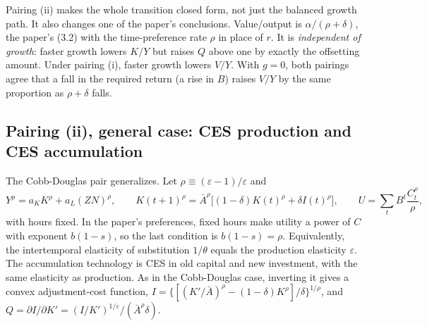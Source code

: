 \documentclass[11pt]{article}
\newcommand{\e}{\varepsilon}
\begin{document}
Pairing (ii) makes the whole transition closed form, not just the balanced growth path.
It also changes one of the paper's conclusions. Value/output is $\alpha/(\rho+\delta)$, the
paper's (3.2) with the time-preference rate $\rho$ in place of $r$. It is \emph{independent of
growth}: faster growth lowers $K/Y$ but raises $Q$ above one by exactly the
offsetting amount. Under pairing (i), faster growth lowers $V/Y$. With $g=0$, both pairings
agree that a fall in the required return (a rise in $B$) raises $V/Y$ by the same
proportion as $\rho+\delta$ falls.

\subsection{Pairing (ii), general case: CES production and CES accumulation}

The Cobb-Douglas pair generalizes. Let $\rho\equiv(\e-1)/\e$ and
\begin{equation}
Y^\rho=a_KK^\rho+a_L(ZN)^\rho,\qquad
K(t+1)^\rho=\bar A^\rho\big[(1-\delta)K(t)^\rho+\delta I(t)^\rho\big],\qquad
U=\sum_t B^t\frac{C_t^{\rho}}{\rho},
\label{eq:cescesd1}
\end{equation}
with hours fixed. In the paper's preferences, fixed hours make utility a power of $C$
with exponent $b(1-s)$, so the last condition is $b(1-s)=\rho$. Equivalently, the
intertemporal elasticity of substitution $1/\theta$ equals the production elasticity
$\e$. The accumulation technology is CES in old capital and new investment, with the
same elasticity as production. As in the Cobb-Douglas case, inverting it gives a convex
adjustment-cost function, $I=\{[(K'/\bar A)^\rho-(1-\delta)K^\rho]/\delta\}^{1/\rho}$, and
$Q=\partial I/\partial K'=(I/K')^{1/\e}/(\bar A^\rho\delta)$.
\end{document}
